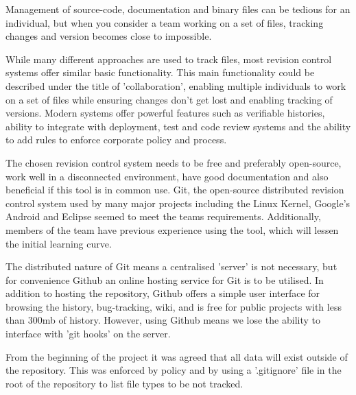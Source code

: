 Management of source-code, documentation and binary files can be tedious for an individual, but when you consider a team working on a set of files, tracking changes and version becomes close to impossible.

While many different approaches are used to track files, most revision control systems offer
similar basic functionality. This main functionality could be described under
the title of 'collaboration', enabling multiple individuals to work on a set of
files while ensuring changes don't get lost and enabling tracking of versions.
Modern systems offer powerful features such as verifiable histories, ability to integrate with deployment, test and code review systems and the ability to add rules to enforce corporate policy and process.

The chosen revision control system needs to be free and preferably open-source,
work well in a disconnected environment, have good documentation and also
beneficial if this tool is in common use. Git\cite{website:git_scm}, the
open-source distributed revision control system used by many major projects
including the Linux Kernel, Google's Android and Eclipse seemed to meet the
teams requirements. Additionally, members of the team have previous experience using the tool, which will lessen the initial learning curve.

The distributed nature of Git means a centralised 'server' is not necessary,
but for convenience Github\cite{website:github} an online hosting service for
Git is to be utilised. In addition to hosting the repository, Github offers a
simple user interface for browsing the history, bug-tracking, wiki, and
is free for public projects with less than 300mb of history. However, using
Github means we lose the ability to interface with 'git hooks' on the server. 

From the beginning of the project it was agreed that all data will exist
outside of the repository. This was enforced by policy and by using a
'.gitignore' file in the root of the repository to list file types to be not tracked.
